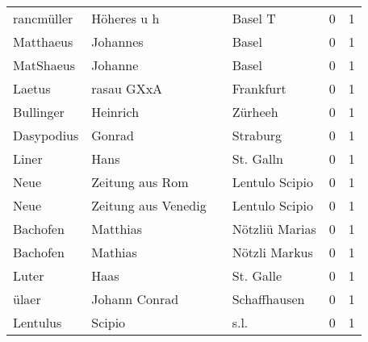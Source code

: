 \begin{tabular}{llllrr}
               rancmüller &                        Höheres u h &             &                                     Basel T &          0 &         1 \\
                Matthaeus &                           Johannes &             &                                       Basel &          0 &         1 \\
                MatShaeus &                            Johanne &             &                                       Basel &          0 &         1 \\
                   Laetus &                         rasau GXxA &             &                                   Frankfurt &          0 &         1 \\
                Bullinger &                           Heinrich &             &                                     Zürheeh &          0 &         1 \\
               Dasypodius &                             Gonrad &             &                                    Straburg &          0 &         1 \\
                    Liner &                               Hans &             &                                   St. Galln &          0 &         1 \\
                     Neue &                    Zeitung aus Rom &             &                              Lentulo Scipio &          0 &         1 \\
                     Neue &                Zeitung aus Venedig &             &                              Lentulo Scipio &          0 &         1 \\
                 Bachofen &                           Matthias &             &                              Nötzliü Marias &          0 &         1 \\
                 Bachofen &                            Mathias &             &                               Nötzli Markus &          0 &         1 \\
                    Luter &                               Haas &             &                                   St. Galle &          0 &         1 \\
                    ülaer &                      Johann Conrad &             &                                Schaffhausen &          0 &         1 \\
                 Lentulus &                             Scipio &             &                                        s.l. &          0 &         1 \\

\end{tabular}
